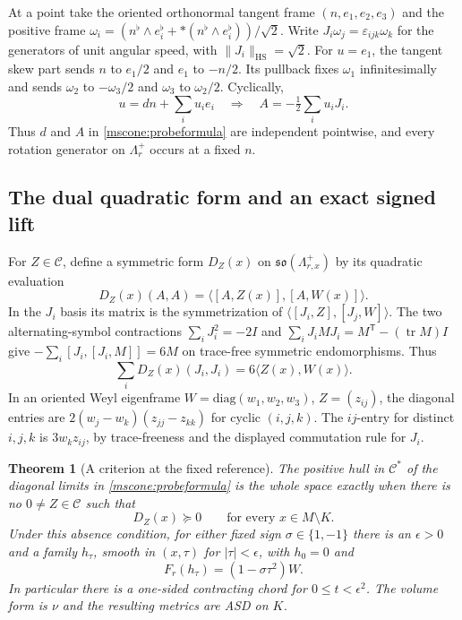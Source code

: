 \documentclass[11pt]{article}
\numberwithin{equation}{section}
\newtheorem{theorem}{Theorem}[section]
\theoremstyle{definition}
\theoremstyle{remark}
\DeclareMathOperator{\tr}{tr}
\newcommand{\HS}{\mathrm{HS}}
\begin{document}
At a point take the oriented orthonormal tangent frame
\((n,e_1,e_2,e_3)\) and the positive frame
\(\omega_i=(n^\flat\wedge e_i^\flat+*(n^\flat\wedge e_i^\flat))/\sqrt2\).
Write \(J_i\omega_j=\varepsilon_{ijk}\omega_k\) for the generators of
unit angular speed, with \(\|J_i\|_{\HS}=\sqrt2\).
For \(u=e_1\), the tangent skew part sends \(n\) to \(e_1/2\)
and \(e_1\) to \(-n/2\). Its pullback fixes \(\omega_1\)
infinitesimally and sends \(\omega_2\) to \(-\omega_3/2\) and
\(\omega_3\) to \(\omega_2/2\). Cyclically,
\[
 u=dn+\sum_i u_i e_i\quad\Longrightarrow\quad
 A=-\tfrac12\sum_i u_iJ_i .
\]
Thus \(d\) and \(A\) in \eqref{mscone:probeformula} are independent
pointwise, and every rotation generator on \(\Lambda_r^+\) occurs
at a fixed \(n\).

\subsection{The dual quadratic form and an exact signed lift}

For \(Z\in\mathcal C\), define a symmetric form \(D_Z(x)\) on
\(\mathfrak{so}(\Lambda_{r,x}^+)\) by its quadratic evaluation
\[
 D_Z(x)(A,A)=\langle[A,Z(x)],[A,W(x)]\rangle .
\]
In the \(J_i\) basis its matrix is the symmetrization of
\(\langle[J_i,Z],[J_j,W]\rangle\). The two alternating-symbol
contractions \(\sum_iJ_i^2=-2I\) and
\(\sum_iJ_iM J_i=M^{\mathsf T}-(\tr M)I\) give
\(-\sum_i[J_i,[J_i,M]]=6M\) on trace-free symmetric
endomorphisms. Thus
\begin{equation}\label{mscone:trace}
 \sum_iD_Z(x)(J_i,J_i)=6\langle Z(x),W(x)\rangle .
\end{equation}
In an oriented Weyl eigenframe \(W=\mathrm{diag}(w_1,w_2,w_3)\),
\(Z=(z_{ij})\), the diagonal entries are
\(2(w_j-w_k)(z_{jj}-z_{kk})\) for cyclic \((i,j,k)\).
The \(ij\)-entry for distinct \(i,j,k\) is \(3w_kz_{ij}\),
by trace-freeness and the displayed commutation rule for \(J_i\).

\begin{theorem}[A criterion at the fixed reference]\label{mscone:chord}
The positive hull in \(\mathcal C^*\) of the diagonal limits
in \eqref{mscone:probeformula} is the whole space exactly when
there is no \(0\ne Z\in\mathcal C\) such that
\begin{equation}\label{mscone:witness}
 D_Z(x)\succeq0\qquad\text{for every }x\in M\setminus K.
\end{equation}
Under this absence condition, for either fixed sign
\(\sigma\in\{1,-1\}\) there is an \(\epsilon>0\) and a family
\(h_\tau\), smooth in \((x,\tau)\) for \(|\tau|<\epsilon\),
with \(h_0=0\) and
\[
 F_r(h_\tau)=(1-\sigma\tau^2)W .
\]
In particular there is a one-sided contracting chord for
\(0\le t<\epsilon^2\). The volume form is \(\nu\) and the resulting
metrics are ASD on \(K\).
\end{theorem}
\end{document}
